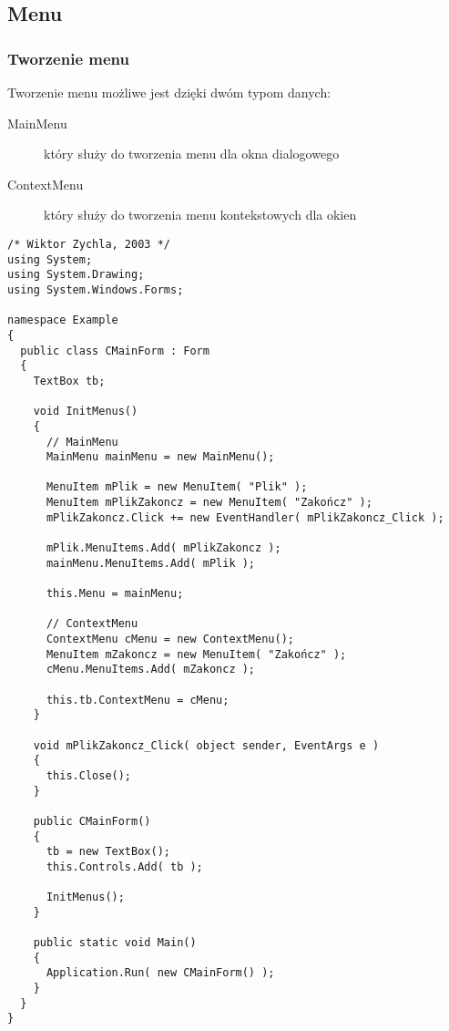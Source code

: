 ﻿\subsection{Menu}

\subsubsection{Tworzenie menu}

Tworzenie menu możliwe jest dzięki dwóm typom danych:
\begin{description}
\item [MainMenu] który służy do tworzenia menu dla okna dialogowego
\item [ContextMenu] który służy do tworzenia menu kontekstowych dla okien
\end{description}

\begin{scriptsize}
\begin{verbatim}
/* Wiktor Zychla, 2003 */
using System;
using System.Drawing;
using System.Windows.Forms;

namespace Example
{
  public class CMainForm : Form
  {   
    TextBox tb; 

    void InitMenus()
    {
      // MainMenu
      MainMenu mainMenu = new MainMenu();

      MenuItem mPlik = new MenuItem( "Plik" );
      MenuItem mPlikZakoncz = new MenuItem( "Zakończ" );
      mPlikZakoncz.Click += new EventHandler( mPlikZakoncz_Click );

      mPlik.MenuItems.Add( mPlikZakoncz );
      mainMenu.MenuItems.Add( mPlik );

      this.Menu = mainMenu; 

      // ContextMenu
      ContextMenu cMenu = new ContextMenu();
      MenuItem mZakoncz = new MenuItem( "Zakończ" );
      cMenu.MenuItems.Add( mZakoncz );
      
      this.tb.ContextMenu = cMenu;
    }

    void mPlikZakoncz_Click( object sender, EventArgs e )
    { 
      this.Close();
    } 

    public CMainForm()
    {
      tb = new TextBox();
      this.Controls.Add( tb );

      InitMenus();
    } 

    public static void Main()
    {
      Application.Run( new CMainForm() );
    }
  }
}
\end{verbatim}
\end{scriptsize}

